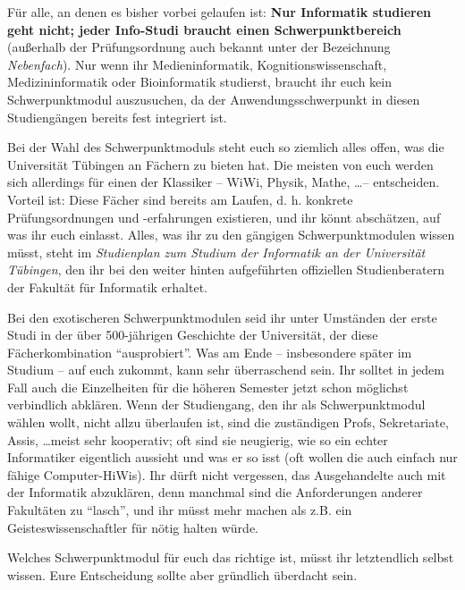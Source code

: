
\newcommand{\nebenfachveraltet}[0]{\emph{Achtung: Dieser Abschnitt ist möglicherweise veraltet.}\par\bigskip}

Für alle, an denen es bisher vorbei gelaufen ist: \textbf{Nur Informatik
  studieren geht nicht; jeder Info-Studi braucht einen Schwerpunktbereich} (außerhalb der Prüfungsordnung auch
  bekannt unter der Bezeichnung \emph{Nebenfach}). Nur wenn ihr
  Medieninformatik, Kognitionswissenschaft, Medizininformatik oder Bioinformatik studierst, braucht ihr euch 
  kein Schwerpunktmodul auszusuchen, da der Anwendungsschwerpunkt in diesen Studiengängen 
  bereits fest integriert ist.


Bei der Wahl des Schwerpunktmoduls steht euch so ziemlich alles offen, was die
  Universität Tübingen an Fächern zu bieten hat. Die meisten
  von euch werden sich allerdings für einen der Klassiker -- WiWi,
  Physik, Mathe, \dots -- entscheiden. Vorteil ist:
  Diese Fächer sind
  bereits am Laufen, d. h. konkrete Prüfungsordnungen und -erfahrungen
  existieren, und ihr könnt abschätzen, auf was ihr euch
  einlasst.  Alles, was ihr zu den gängigen Schwerpunktmodulen wissen müsst,
  steht im \emph{Studienplan zum Studium der Informatik an der Universität
  Tübingen}, den ihr bei den weiter hinten aufgeführten offiziellen
  Studienberatern der Fakultät für Informatik erhaltet.

Bei den exotischeren Schwerpunktmodulen seid ihr unter Umständen der erste Studi in
  der über 500-jährigen Geschichte der Universität, der diese
  Fächerkombination "`ausprobiert"'.  Was am Ende -- insbesondere
  später im Studium -- auf euch zukommt, kann sehr überraschend
  sein.  Ihr solltet in jedem Fall auch die Einzelheiten für die
  höheren Semester jetzt schon möglichst verbindlich abklären.  Wenn der
  Studiengang, den ihr als Schwerpunktmodul wählen wollt, nicht allzu
  überlaufen ist, sind die zuständigen Profs, Sekretariate, Assis,
  \dots meist sehr kooperativ; oft sind sie neugierig, wie so ein echter
  Informatiker eigentlich aussieht und was er so isst (oft wollen die
  auch einfach nur fähige Computer-HiWis).  Ihr dürft nicht vergessen,
  das Ausgehandelte auch mit der Informatik abzuklären,
  denn manchmal sind die Anforderungen anderer Fakultäten zu "`lasch"',
  und ihr müsst mehr machen als z.B. ein Geisteswissenschaftler für
  nötig halten würde.

Welches Schwerpunktmodul für euch das richtige ist, müsst ihr letztendlich
  selbst wissen.  Eure Entscheidung sollte aber gründlich überdacht
  sein.


